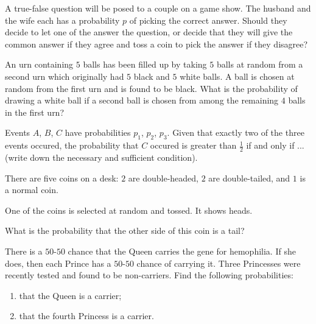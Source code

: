 \begin{problem}[Handout 4, \# 12]
  A true-false question will be posed to a couple on a game show. The
  husband and the wife each has a probability \(p\) of picking the correct
  answer. Should they decide to let one of the answer the question, or
  decide that they will give the common answer if they agree and toss a
  coin to pick the answer if they disagree?
\end{problem}
\begin{solution*}

\end{solution*}

\begin{problem}[Handout 4, \# 13]
  An urn containing \(5\) balls has been filled up by taking \(5\) balls at
  random from a second urn which originally had \(5\) black and \(5\) white
  balls. A ball is chosen at random from the first urn and is found to be
  black. What is the probability of drawing a white ball if a second ball
  is chosen from among the remaining \(4\) balls in the first urn?
\end{problem}
\begin{solution*}
\end{solution*}

\begin{problem}[Handout 4, \# 15]
  Events \(A\), \(B\), \(C\) have probabilities \(p_1\), \(p_2\),
  \(p_3\). Given that exactly two of the three events occured, the
  probability that \(C\) occured is greater than \(\frac{1}{2}\) if and
  only if ...\@ (write down the necessary and sufficient condition).
\end{problem}
\begin{solution*}
\end{solution*}

\begin{problem}[Handout 5, \# 1]
  There are five coins on a desk: \(2\) are double-headed, \(2\) are
  double-tailed, and \(1\) is a normal coin.

  \noindent One of the coins is selected at random and tossed. It shows
  heads.

  \noindent What is the probability that the other side of this coin is a
  tail?
\end{problem}
\begin{solution*}
\end{solution*}

\begin{problem}
  There is a \(50\)-\(50\) chance that the Queen carries the gene for
  hemophilia. If she does, then each Prince has a \(50\)-\(50\) chance of
  carrying it. Three Princesses were recently tested and found to be
  non-carriers. Find the following probabilities:
  \begin{enumerate}[label=(\alph*),noitemsep]
  \item that the Queen is a carrier;
  \item that the fourth Princess is a carrier.
  \end{enumerate}
\end{problem}
\begin{solution*}
\end{solution*}

